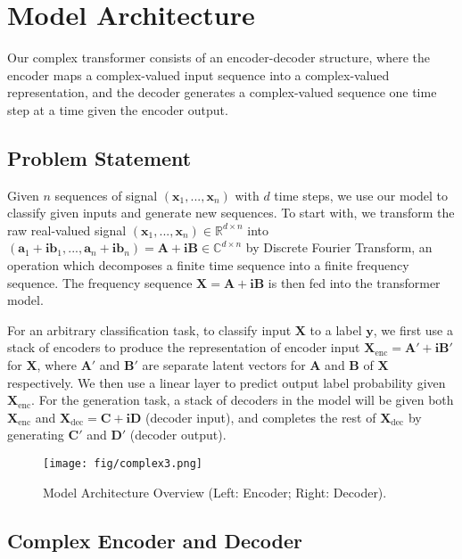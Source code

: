 \documentclass{article}
\def\vx{{\mathbf x}}
\def\vy{{\mathbf y}}
\def\va{{\mathbf a}}
\def\vb{{\mathbf b}}
\def\vi{{\mathbf i}}
\def\mX{{\mathbf X}}
\def\mA{{\mathbf A}}
\def\mB{{\mathbf B}}
\def\mC{{\mathbf C}}
\def\mD{{\mathbf D}}
\begin{document}
\section{Model Architecture}
\label{sec:model}

Our complex transformer consists of an encoder-decoder structure, where the encoder maps a complex-valued input sequence into a complex-valued representation, and the decoder generates a complex-valued sequence one time step at a time given the encoder output.

\subsection{Problem Statement}
Given $n$ sequences of signal $(\vx_1, ..., \vx_n)$ with $d$ time steps, we use our model to classify given inputs and generate new sequences. To start with, we transform the raw real-valued signal $(\vx_1, ..., \vx_n) \in \mathbb{R}^{d \times n}$ into $(\va_1 + \vi \vb_1, ..., \va_n + \vi \vb_n) = \mA + \vi \mB \in \mathbb{C}^{d \times n}$ by Discrete Fourier Transform, an operation which decomposes a finite time sequence into a finite frequency sequence. The frequency sequence $\mX = \mA + \vi \mB$ is then fed into the transformer model. 

For an arbitrary classification task, to classify input $\mX$ to a label $\vy$, we first use a stack of encoders to produce the representation of encoder input $\mX_{\text{enc}} = \mA' + \vi \mB'$ for $\mX$, where $\mA'$ and $\mB'$ are separate latent vectors for $\mA$ and $\mB$ of $\mX$ respectively. We then use a linear layer to predict output label probability given $\mX_{\text{enc}}$. For the generation task, a stack of decoders in the model will be given both $\mX_{\text{enc}}$ and  $\mX_{\text{dec}} = \mC + \vi \mD$ (decoder input), and completes the rest of $\mX_{\text{dec}}$ by generating $\mC'$ and $\mD'$ (decoder output). 
\begin{figure*}[]
\begin{center}
\texttt{[image: fig/complex3.png]}
\end{center}
\caption{Model Architecture Overview (Left: Encoder; Right: Decoder).}
\label{fig:arch}
\end{figure*}
\vspace{-3mm}

\subsection{Complex Encoder and Decoder}
\end{document}
